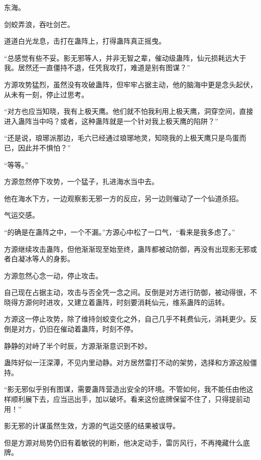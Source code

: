
\begin{this_body}

东海。

剑蛟弄浪，吞吐剑芒。

道道白光龙息，击打在蛊阵上，打得蛊阵真正摇曳。

“总感觉有些不妥。影无邪等人，并非无智之辈，催动级蛊阵，仙元损耗远大于我。居然还一直僵持不退，任凭我攻打，难道是别有图谋？”

方源攻势猛烈，虽然没有攻破蛊阵，但牢牢占据主动，他的脑海中更是念头起伏，从未有一刻，停止过思考。

“对方也应当知晓，我有上极天鹰。他们就不怕我利用上极天鹰，洞穿空间，直接进入蛊阵当中吗？或者，这种蛊阵就是一个针对我上极天鹰的陷阱？”

“还是说，琅琊派那边，毛六已经通过琅琊地灵，知晓我的上极天鹰只是鸟蛋而已，因此并不惧怕？”

“等等。”

方源忽然停下攻势，一个猛子，扎进海水当中去。

他在海水下方，一边观察影无邪一方的反应，另一边则催动了一个仙道杀招。

气运交感。

“的确是在蛊阵之中，一个不漏。”方源心中松了一口气，“看来是我多虑了。”

方源继续攻击蛊阵，但他渐渐现至始至终，蛊阵都被动防御，再没有出现影无邪或者白凝冰等人的身影。

方源忽然心念一动，停止攻击。

自己现在占据主动，攻击与否全凭一念之间。反倒是对方进行防御，被动得很，不晓得方源何时进攻，又建立着蛊阵，时刻要消耗仙元，维系蛊阵的运转。

方源这一停止攻势，除了维持剑蛟变化之外，自己几乎不耗费仙元，消耗更少。反倒是对方，仍旧在催动着蛊阵，时刻不停。

静静的对峙了半个时辰，方源渐渐意识到不妙。

蛊阵好似一汪深潭，不见内里动静。对方居然雷打不动的架势，选择和方源这般僵持。

“影无邪似乎别有图谋，需要蛊阵营造出安全的环境。不管如何，我不能任由他这样顺利展下去，应当迅出手，加以破坏。看来这份底牌保留不住了，只得提前动用！”

影无邪的计谋虽然生效，方源的气运交感的结果被误导。

但是方源对局势仍旧有着敏锐的判断，他决定动手，雷厉风行，不再掩藏什么底牌。


\end{this_body}
